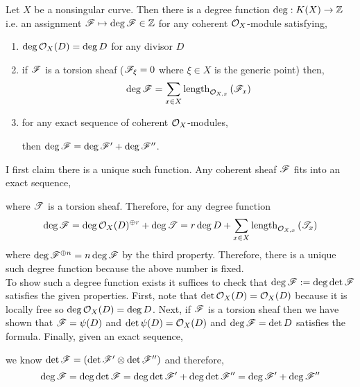 \documentclass[12pt]{article}
\begin{document}
Let $X$ be a nonsingular curve. Then there is a degree function $\deg : K(X) \to \mathbb{Z}$ i.e. an assignment $\mathscr{F} \mapsto \deg{\mathscr{F}} \in \mathbb{Z}$ for any coherent $\mathcal{O}_{X}$-module satisfying,
\begin{enumerate}
\item $\deg{\mathcal{O}_{X}(D)} = \deg{D}$ for any divisor $D$
\item if $\mathscr{F}$ is a torsion sheaf ($\mathscr{F}_\xi = 0$ where $\xi \in X$ is the generic point) then,
\[ \deg{\mathscr{F}} = \sum_{x \in X} \mathrm{length}_{\mathcal{O}_{X, x}}\left( \mathscr{F}_x \right) \]
\item for any exact sequence of coherent $\mathcal{O}_{X}$-modules,
\begin{center}
\end{center}
then $\deg{\mathscr{F}} = \deg{\mathscr{F}'} + \deg{\mathscr{F}''}$.
\end{enumerate}
I first claim there is a unique such function. Any coherent sheaf $\mathscr{F}$ fits into an exact sequence,
\begin{center}
\end{center}
where $\mathscr{T}$ is a torsion sheaf. Therefore, for any degree function
\[ \deg{\mathscr{F}} = \deg{\mathcal{O}_{X}(D)^{\oplus r}} + \deg{\mathscr{T}} = r \deg{D} + \sum_{x \in X} \mathrm{length}_{\mathcal{O}_{X, x}}\left( \mathscr{T}_x \right) \]
where $\deg{\mathscr{F}^{\oplus n}} = n \deg{\mathscr{F}}$ by the third property. Therefore, there is a unique such degree function because the above number is fixed. 
\bigskip\\
To show such a degree function exists it suffices to check that $\deg{\mathscr{F}} := \deg{\det{\mathscr{F}}}$ satisfies the given properties. First, note that $\det{\mathcal{O}_{X}(D)} = \mathcal{O}_{X}(D)$ because it is locally free so $\deg{\mathcal{O}_{X}(D)} = \deg{D}$. Next, if $\mathscr{F}$ is a torsion sheaf then we have shown that $\mathscr{F} = \psi(D)$ and $\det{\psi(D)} = \mathcal{O}_{X}(D)$ and $\deg{\mathscr{F}} = \det{D}$ satisfies the formula. Finally, given an exact sequence,
\begin{center}
\end{center}
we know $\det{\mathscr{F}} = (\det{\mathscr{F}'} \otimes \det{\mathscr{F}''})$ and therefore,
\[ \deg{\mathscr{F}} = \deg{\det{\mathscr{F}}} = \deg{\det{\mathscr{F}'}} + \deg{\det{\mathscr{F}''}} = \deg{\mathscr{F}'} + \deg{\mathscr{F}''} \]
\end{document}
